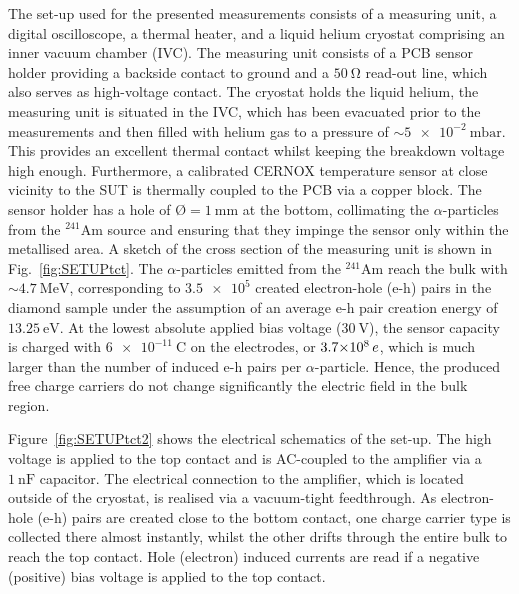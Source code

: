The set-up used for the presented measurements consists of a measuring unit, a digital oscilloscope, a thermal heater, and a liquid helium cryostat comprising an inner vacuum chamber (IVC). 
The measuring unit consists of a PCB sensor holder providing a backside contact to ground and a $\SI{50}{\ohm}$ read-out line, which also serves as high-voltage contact. 
The cryostat holds the liquid helium, the measuring unit is situated in the IVC,
 which has been evacuated prior to the measurements and then filled with helium gas to a pressure of $\sim\SI{5e-2}{\milli\bar}$.
This provides an excellent thermal contact whilst keeping the breakdown voltage high enough. 
Furthermore, a calibrated CERNOX temperature sensor at close vicinity to the SUT is thermally coupled to the PCB via a copper block. 
The sensor holder has a hole of $\textrm{\O} = \SI{1}{\milli\meter}$ at the bottom, collimating the $\alpha$-particles from the ${}^{241}\textrm{Am}$ source
 and ensuring that they impinge the sensor only within the metallised area.
A sketch of the cross section of the measuring unit is shown in Fig.~\ref{fig:SETUPtct}. %
The $\alpha$-particles emitted from the ${}^{241}\textrm{Am}$ %
reach the bulk with $\sim \SI{4.7}{\MeV}$,
 corresponding to $\num{3.5e5}$ created electron-hole (e-h) pairs in the diamond sample under the assumption of an average e-h pair creation energy of $\SI{13.25}{\eV}$\cite{4329650}. 
At the lowest absolute applied bias voltage ($\SI{30}{\volt}$), the sensor capacity is charged with $\SI{6e-11}{\coulomb}$ on the electrodes,
 or $\SI{3.7e8}{\ensuremath{\mathnormal{e}}}$, which is much larger than the number of induced e-h pairs per $\alpha$-particle. 
Hence, the produced free charge carriers do not change significantly the electric field in the bulk region. 

Figure~\ref{fig:SETUPtct2} shows the electrical schematics of the set-up. 
The high voltage is applied to the top contact and is AC-coupled to the amplifier via a $\SI{1}{\nano\farad}$ capacitor. 
The electrical connection to the amplifier, which is located outside of the cryostat, is realised via a vacuum-tight feedthrough. 
As electron-hole (e-h) pairs are created close to the bottom contact,
 one charge carrier type is collected there almost instantly,
 whilst the other drifts through the entire bulk to reach the top contact. 
Hole (electron) induced currents are read if a negative (positive) bias voltage is applied to the top contact.

